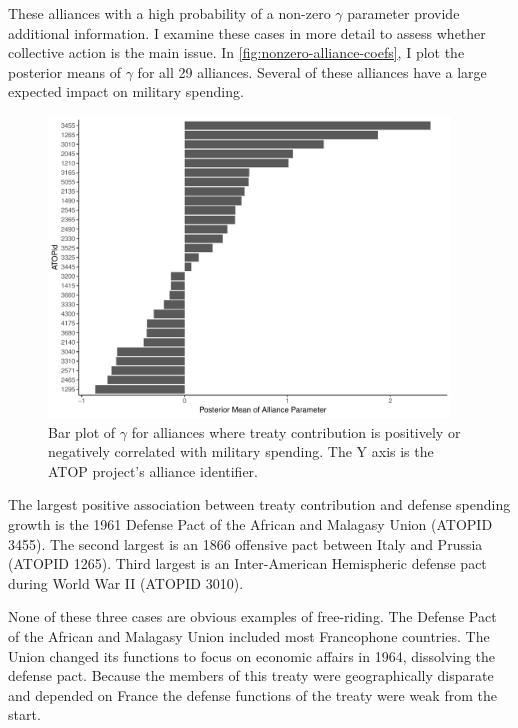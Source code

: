 \documentclass[12pt]{article}
\begin{document}
These alliances with a high probability of a non-zero $\gamma$ parameter provide additional information. 
I examine these cases in more detail to assess whether collective action is the main issue. 
In \autoref{fig:nonzero-alliance-coefs}, I plot the posterior means of $\gamma$ for all 29 alliances.  
Several of these alliances have a large expected impact on military spending. 


\begin{figure}
	\centering
		\includegraphics[width=0.95\textwidth]{nonzero-alliance-coefs.pdf}
	\caption{Bar plot of $\gamma$ for alliances where treaty contribution is positively or negatively correlated with military spending. The Y axis is the ATOP project's alliance identifier.}	
	\label{fig:nonzero-alliance-coefs}
\end{figure}

 
The largest positive association between treaty contribution and defense spending growth is the 1961 Defense Pact of the African and Malagasy Union (ATOPID 3455). 
The second largest is an 1866 offensive pact between Italy and Prussia (ATOPID 1265). 
Third largest is an Inter-American Hemispheric defense pact during World War II (ATOPID 3010). 


None of these three cases are obvious examples of free-riding. 
The Defense Pact of the African and Malagasy Union included most Francophone countries. 
The Union changed its functions to focus on economic affairs in 1964, dissolving the defense pact. 
Because the members of this treaty were geographically disparate and depended on France the defense functions of the treaty were weak from the start. 
\end{document}
